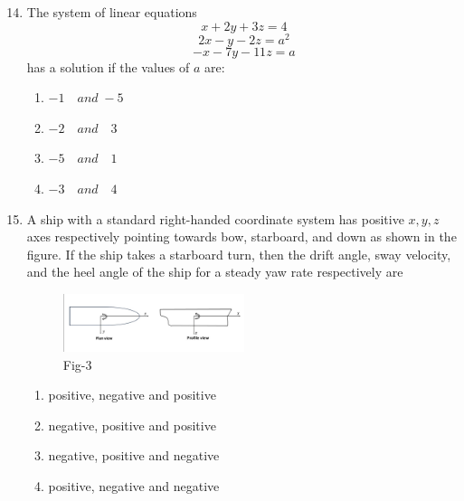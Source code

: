 \documentclass[journal]{IEEEtran}
\theoremstyle{remark}
\begin{document}
\newpage
\vspace*{0.25cm}

\begin{enumerate}[itemsep=1em]
\setcounter{enumi}{13}
\item The system of linear equations 
\[
x + 2y + 3z = 4
\]
\[
2x - y - 2z = a^2
\]
\[
- x - 7y - 11z = a
\]
has a solution if the values of $a$ are:
\begin{multicols}{4}
\begin{enumerate}
        \item $-1\quad and\;-5$
        \item $-2\quad and\quad3$
        \item $-5\quad and\quad1$
        \item $-3\quad and\quad4$
\end{enumerate}
\end{multicols}

\end{enumerate}

\begin{enumerate}[itemsep=1em]
\setcounter{enumi}{14}
\item A ship with a standard right-handed coordinate system has positive \(x, y, z\) axes respectively pointing towards bow, starboard, and down as shown in the figure. If the ship takes a starboard turn, then the drift angle, sway velocity, and the heel angle of the ship for a steady yaw rate respectively are
\begin{figure}[H]
    \centering
    \includegraphics[width=0.5\textwidth]{figs/fig-3.jpeg}
    \caption*{Fig-3}
    \label{fig-3}
\end{figure}
\begin{enumerate}[leftmargin=2.5em, labelsep=0.5em, itemsep=0.5em]
        \item positive, negative and positive
        \item negative, positive and positive
        \item negative, positive and negative
        \item positive, negative and negative
\end{enumerate}

\end{enumerate}
\end{document}
